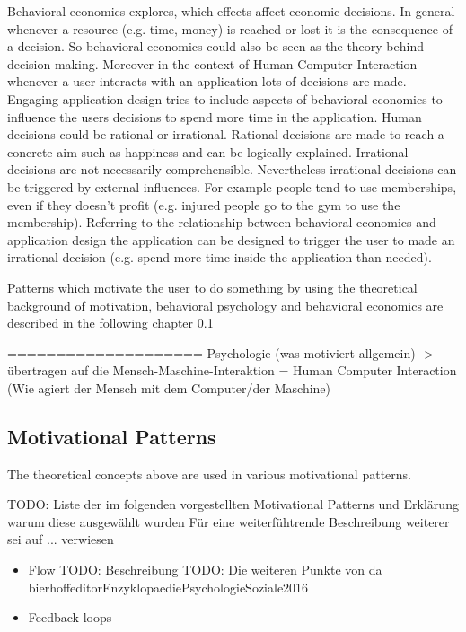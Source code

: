 Behavioral economics explores, which effects affect economic decisions. In general whenever a resource (e.g. time, money) is reached or lost it is the consequence of a decision. So behavioral economics could also be seen as the theory behind decision making. Moreover in the context of Human Computer Interaction whenever a user interacts with an application 
lots of decisions are made. Engaging application design tries to include aspects of behavioral economics to influence the users decisions to spend more time in the application. 
Human decisions could be rational or irrational. Rational decisions are made to reach a concrete aim such as happiness and can be logically explained. Irrational decisions are not necessarily comprehensible.  Nevertheless irrational decisions can be triggered by external influences. For example people tend to use memberships, even if they doesn't profit (e.g. injured people go to the gym to use the membership).
Referring to the relationship between behavioral economics and application design the application can be designed to trigger the user to made an irrational decision (e.g. spend more time inside the application than needed). \cite[p. 19]{lewisIrresistibleAppsMotivational2014}


Patterns which motivate the user to do something by using the theoretical background of motivation, behavioral psychology and behavioral economics are described in the following chapter \ref{sec:theoryBc}

====================\newline
Psychologie (was motiviert allgemein) -> übertragen auf die Mensch-Maschine-Interaktion = Human Computer Interaction (Wie agiert der Mensch mit dem Computer/der Maschine)

\subsection{Motivational Patterns}
\label{sec:theoryBc}

The theoretical concepts above are used in various motivational patterns.

TODO: Liste der im folgenden vorgestellten Motivational Patterns und Erklärung warum diese ausgewählt wurden
Für eine weiterfühtrende Beschreibung weiterer sei auf ... verwiesen

\begin{itemize}
	\item Flow \newline
	TODO: Beschreibung \cite[p. 19, 20, 21]{bierhoffeditorEnzyklopaediePsychologieSoziale2016}
	TODO: Die weiteren Punkte von da bierhoffeditorEnzyklopaediePsychologieSoziale2016
	\item Feedback loops
\end{itemize}


